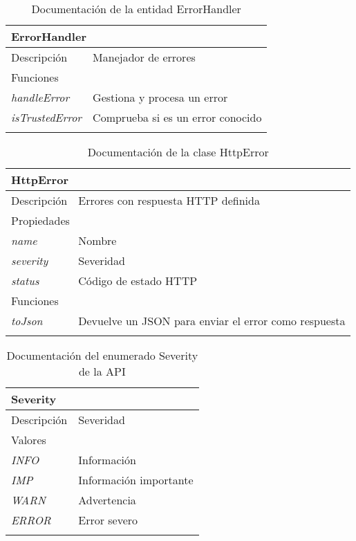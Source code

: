 \begin{longtable}{|p{} p{}|}
    \hline
    \multicolumn{2}{|l|}{\textbf{ErrorHandler}} \\ \hline \hline
    Descripción      & Manejador de errores  \\ \hline
    \multicolumn{2}{|l|}{Funciones} \\
    \emph{handleError}  & Gestiona y procesa un error  \\
    \emph{isTrustedError}  & Comprueba si es un error conocido  \\  \hline
    \caption{Documentación de la entidad ErrorHandler}
    \label{dis:api:error_handler}
\end{longtable}

\newpage
\begin{longtable}{|p{} p{}|}
    \hline
    \multicolumn{2}{|l|}{\textbf{HttpError}} \\ \hline \hline
    Descripción      & Errores con respuesta HTTP definida  \\ \hline
    \multicolumn{2}{|l|}{Propiedades} \\
    \emph{name}  & Nombre  \\
    \emph{severity}  & Severidad  \\
    \emph{status}  & Código de estado HTTP  \\ \hline
    \multicolumn{2}{|l|}{Funciones} \\
    \emph{toJson}  & Devuelve un JSON para enviar el error como respuesta  \\  \hline
    \caption{Documentación de la clase HttpError}
    \label{dis:api:http_error}
\end{longtable}

\begin{longtable}{|p{} p{}|}
    \hline
    \multicolumn{2}{|l|}{\textbf{Severity}} \\ \hline \hline
    Descripción      & Severidad \\ \hline
    \multicolumn{2}{|l|}{Valores} \\
    \emph{INFO}  & Información  \\
    \emph{IMP}  & Información importante  \\
    \emph{WARN}  & Advertencia  \\
    \emph{ERROR}  & Error severo  \\ \hline
    \caption{Documentación del enumerado Severity de la API}
    \label{dis:api:severity}
\end{longtable}

